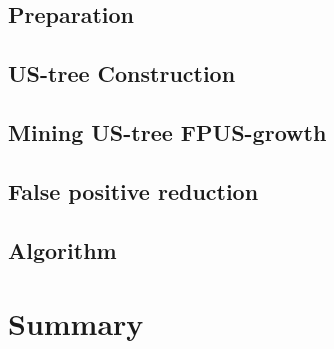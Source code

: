 \documentclass[a4paper,12pt]{book}
\begin{document}
\subsection{Preparation}


\subsection{US-tree Construction}

\subsection{Mining US-tree FPUS-growth}

\newpage
\subsection{False positive reduction}

\subsection{Algorithm}

\newpage
\section{Summary}

\end{document}
